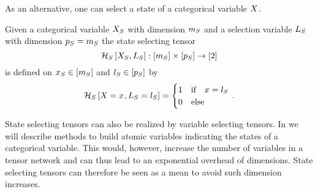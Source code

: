 
As an alternative, one can select a state of a categorical variable $X$.

\begin{definition}\label{def:stateSelector}
	Given a categorical variable $X_{S}$ with dimension $m_{S}$ and a selection variable $L_{S}$ with dimension $p_{S}=m_{S}$ the state selecting tensor 
		\[ \mathcal{H}_{S}\left[X_{S},L_{S}\right] : [m_{S}] \times [p_{S}] \rightarrow [2] \]
	is defined on $x_{S}\in[m_{S}]$ and $l_{S}\in[p_{S}]$ by
	\begin{align*}
		\mathcal{H}_{S}\left[X_{}=x_{},L_{S}=l_{S}\right] = 
		\begin{cases}
			1 & \text{if} \quad x = l_{S} \\
			0 & \text{else}
		\end{cases} \, . 
	\end{align*}
\end{definition}

State selecting tensors can also be realized by variable selecting tensors.
In  we will describe methods to build atomic variables indicating the states of a categorical variable.
This would, however, increase the number of variables in a tensor network and can thus lead to an exponential overhead of dimensions.
State selecting tensors can therefore be seen as a mean to avoid such dimension increases.










